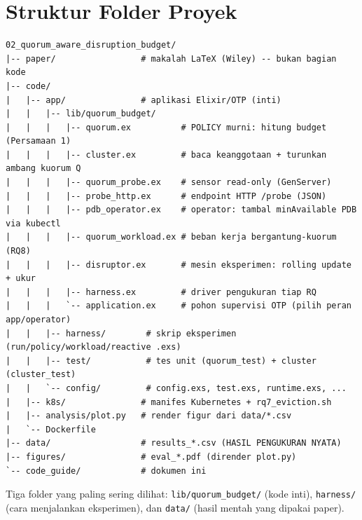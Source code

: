 \documentclass[11pt]{article}
\newcommand{\code}[1]{\texttt{\small #1}}
\begin{document}
\section{Struktur Folder Proyek}
\label{sec:struktur}
\begin{lstlisting}[style=sh]
02_quorum_aware_disruption_budget/
|-- paper/                 # makalah LaTeX (Wiley) -- bukan bagian kode
|-- code/
|   |-- app/               # aplikasi Elixir/OTP (inti)
|   |   |-- lib/quorum_budget/
|   |   |   |-- quorum.ex          # POLICY murni: hitung budget (Persamaan 1)
|   |   |   |-- cluster.ex         # baca keanggotaan + turunkan ambang kuorum Q
|   |   |   |-- quorum_probe.ex    # sensor read-only (GenServer)
|   |   |   |-- probe_http.ex      # endpoint HTTP /probe (JSON)
|   |   |   |-- pdb_operator.ex    # operator: tambal minAvailable PDB via kubectl
|   |   |   |-- quorum_workload.ex # beban kerja bergantung-kuorum (RQ8)
|   |   |   |-- disruptor.ex       # mesin eksperimen: rolling update + ukur
|   |   |   |-- harness.ex         # driver pengukuran tiap RQ
|   |   |   `-- application.ex     # pohon supervisi OTP (pilih peran app/operator)
|   |   |-- harness/        # skrip eksperimen (run/policy/workload/reactive .exs)
|   |   |-- test/           # tes unit (quorum_test) + cluster (cluster_test)
|   |   `-- config/         # config.exs, test.exs, runtime.exs, ...
|   |-- k8s/               # manifes Kubernetes + rq7_eviction.sh
|   |-- analysis/plot.py   # render figur dari data/*.csv
|   `-- Dockerfile
|-- data/                  # results_*.csv (HASIL PENGUKURAN NYATA)
|-- figures/               # eval_*.pdf (dirender plot.py)
`-- code_guide/            # dokumen ini
\end{lstlisting}
Tiga folder yang paling sering dilihat: \code{lib/quorum\_budget/} (kode inti), \code{harness/} (cara
menjalankan eksperimen), dan \code{data/} (hasil mentah yang dipakai paper).

\end{document}
